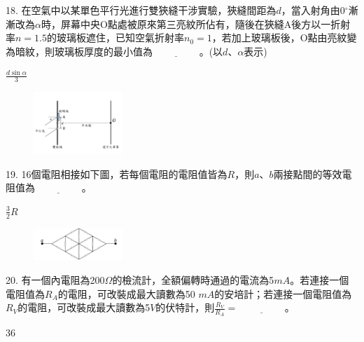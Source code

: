 \documentclass[cn,10pt,math=newtx]{elegantbook}
\begin{document}
\begin{example}
   18. 在空氣中以某單色平行光進行雙狹縫干涉實驗，狹縫間距為$d$，當入射角由0$^\circ$漸漸改為$\alpha$時，屏幕中央O點處被原來第三亮紋所佔有，隨後在狹縫A後方以一折射率$n=1.5$的玻璃板遮住，已知空氣折射率$n_0=1$，若加上玻璃板後，O點由亮紋變為暗紋，則玻璃板厚度的最小值為$\underline{\hspace{2cm}}$。(以$d、\alpha$表示)\\
    \rightline{[桃園高中教甄109]}
\end{example}
\begin{solution}
    $\frac{d \sin{\alpha}}{3}$
\end{solution}
\begin{figure}[htbp]
    \flushright
    \includegraphics[width=0.3\textwidth]{image/109桃園18.png}
  \end{figure}
\newpage


\begin{example}
   19. 16個電阻相接如下圖，若每個電阻的電阻值皆為$R$，則$a、b$兩接點間的等效電阻值為$\underline{\hspace{2cm}}$。\\
    \rightline{[桃園高中教甄109]}
\end{example}
\begin{solution}
    $\frac{3}{2} R$
\end{solution}
\begin{figure}[htbp]
    \flushright
    \includegraphics[width=0.3\textwidth]{image/109桃園19.png}
  \end{figure}
\newpage

\begin{example}
   20. 有一個內電阻為200$\Omega$的檢流計，全額偏轉時通過的電流為5$mA$。若連接一個電阻值為$R_A$的電阻，可改裝成最大讀數為50 $mA$的安培計；若連接一個電阻值為$R_V$的電阻，可改裝成最大讀數為5$V$的伏特計，則$\frac{R_V}{R_A}=\underline{\hspace{2cm}}$。\\
    \rightline{[桃園高中教甄109]}
\end{example}
\begin{solution}
    $36$
\end{solution}
\end{document}
